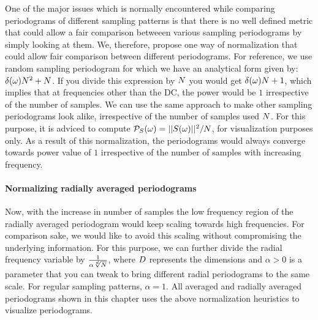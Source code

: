\documentclass[11pt,fleqn]{book} %
\begin{document}
One of the major issues which is normally encountered while comparing periodograms of different sampling patterns is that there is no well defined metric that could allow a fair comparison betweeen various sampling periodograms by simply looking at them. We, therefore, propose one way of normalization that could allow fair comparison between different periodograms. For reference, we use random sampling periodogram for which we have an analytical form given by: $\delta(\omega) N^2 + N$. 
%
%
If you divide this expression by $N$ you would get $\delta(\omega) N + 1$, which implies that at frequencies other than the DC, the power would be $1$ irrespective of the number of samples. 
We can use the same approach to make other sampling periodograms look alike, irrespective of the number of samples used $N$. For this purpose, it is adviced to compute $\mathcal{P}_{S}(\mathbf{\omega}) = ||S(\mathbf{\omega})||^2 / N$, for visualization  purposes only. As a result of this normalization, the periodograms would always converge towards power value of $1$ irrespective of the number of samples with increasing frequency.

\paragraph{Normalizing radially averaged periodograms} 
Now, with the increase in number of samples the low frequency region of the radially averaged periodogram would keep scaling towards high frequencies. %
For comparison sake, we would like to avoid this scaling without compromising the underlying information. For this purpose, we can further divide the radial frequency variable by $\frac{1}{\alpha \sqrt[d]{N}}$, where ${D}$ represents the dimensions and $\alpha > 0$ is a parameter that you can tweak to bring different radial periodograms to the same scale. For regular sampling patterns, $\alpha=1$. All averaged and radially averaged periodograms shown in this chapter uses the above normalization heuristics to visualize periodograms.
\end{document}
